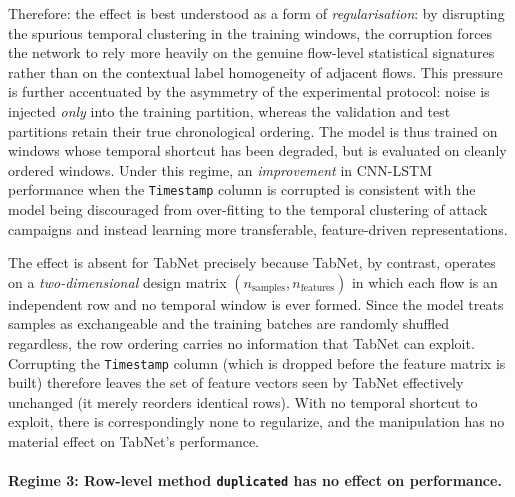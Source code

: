 \documentclass[../main.tex]{subfiles}
\begin{document}
Therefore: the effect is best understood as a form of \emph{regularisation}: by disrupting the spurious temporal clustering in the training windows, the corruption forces the network to rely more heavily on the genuine flow-level statistical signatures rather than on the contextual label homogeneity of adjacent flows. This pressure is further accentuated by the asymmetry of the experimental protocol: noise is injected \emph{only} into the training partition, whereas the validation and test partitions retain their true chronological ordering. The model is thus trained on windows whose temporal shortcut has been degraded, but is evaluated on cleanly ordered windows. Under this regime, an
\emph{improvement} in CNN-LSTM performance when the \texttt{Timestamp} column is corrupted is consistent with the model being discouraged from over-fitting to the temporal clustering of attack campaigns and instead learning more transferable, feature-driven representations.

The effect is absent for TabNet precisely because TabNet, by contrast, operates on a \emph{two-dimensional} design matrix $(n_{\text{samples}}, n_{\text{features}})$ in which each flow is an independent row and no temporal window is ever formed. Since the model treats samples as exchangeable and the training batches are randomly shuffled regardless, the row ordering carries no information that TabNet can exploit. Corrupting the \texttt{Timestamp} column (which is dropped before the feature matrix is built) therefore leaves the set of feature vectors seen by TabNet effectively unchanged (it merely reorders identical rows). With no temporal shortcut to exploit, there is correspondingly none to regularize, and the manipulation has no material effect on TabNet's performance.




\paragraph{Regime 3: Row-level method \texttt{duplicated} has no effect on performance.}
\end{document}
